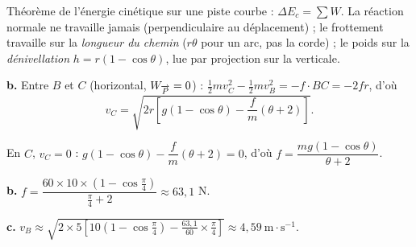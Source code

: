 \documentclass[11pt]{article}
\begin{document}
\begin{methode}
Théorème de l'énergie cinétique sur une piste courbe :
$\Delta E_c = \sum W$. La réaction normale ne travaille jamais
(perpendiculaire au déplacement) ; le frottement travaille sur la
\emph{longueur du chemin} ($r\theta$ pour un arc, pas la corde) ; le
poids sur la \emph{dénivellation} $h = r(1 - \cos\theta)$, lue par
projection sur la verticale.
\end{methode}

\textbf{b.} Entre $B$ et $C$ (horizontal, $W_{\overrightarrow{P}} = 0$) : $\frac{1}{2}mv_C^2 - \frac{1}{2}mv_B^2 = -f\cdot BC = -2fr$, d'où
\[ v_C = \sqrt{2r\left[g(1-\cos\theta) - \frac{f}{m}(\theta + 2)\right]}. \]

 En $C$, $v_C = 0$ : $g(1-\cos\theta) - \dfrac{f}{m}(\theta + 2) = 0$, d'où $f = \dfrac{mg(1-\cos\theta)}{\theta + 2}$.

\textbf{b.} $f = \dfrac{60\times 10\times(1 - \cos\frac{\pi}{4})}{\frac{\pi}{4} + 2} \approx 63{,}1$ N.

\textbf{c.} $v_B \approx \sqrt{2\times 5\left[10\left(1 - \cos\frac{\pi}{4}\right) - \frac{63{,}1}{60}\times\frac{\pi}{4}\right]} \approx 4{,}59\ \text{m}\cdot\text{s}^{-1}$.
\end{document}
